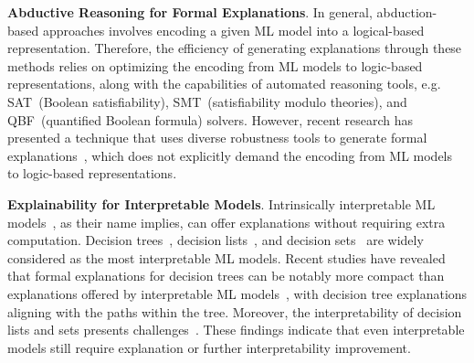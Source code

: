 
\textbf{Abductive Reasoning for Formal Explanations}.
%
In general, abduction-based approaches involves encoding a given
ML model into a logical-based representation.
%
Therefore, the efficiency of generating explanations through
these methods relies on optimizing the encoding from ML models 
to logic-based representations, along with the capabilities of automated 
reasoning tools, e.g. SAT~(Boolean satisfiability), SMT~(satisfiability modulo theories), 
and QBF~(quantified Boolean formula) solvers.
%
However, recent research has presented a technique that uses diverse 
robustness tools to generate formal explanations~\cite{hms-corr23d}, 
which does not explicitly demand the encoding from ML models 
to logic-based representations.

\textbf{Explainability for Interpretable Models}.
%
Intrinsically interpretable ML models~\cite{molnar-bk20,rudin-nmi-19,blrs-ceur22,lzlsr-neurips22,clrsww-dss22,srp-fat22}, 
as their name implies, can offer explanations without requiring extra computation.
%
Decision trees~\cite{rivest-ipl76,breiman-bk84,quinlan-bk93,quinlan-ml86}, 
decision lists~\cite{rudin-mpc18,rivest-ml87}, 
and decision sets~\cite{leskovec-kdd16,michalski-isip69} are widely considered as 
the most interpretable ML models.
%
Recent studies have revealed that formal explanations for decision trees 
can be notably more compact than explanations offered by interpretable ML models~\cite{iims-corr20,iims-jair22},
with decision tree explanations aligning with the paths within the tree.
%
Moreover, the interpretability of decision lists and sets presents challenges~\cite{msi-fai23}. 
%
These findings indicate that even interpretable models still require explanation or 
further interpretability improvement.
